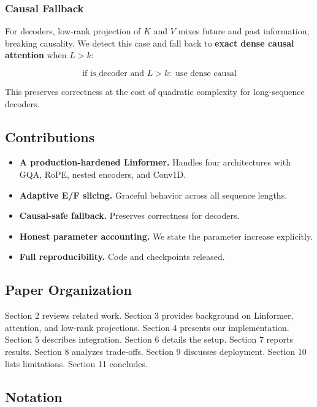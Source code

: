 \subsubsection{Causal Fallback}

For decoders, low-rank projection of $K$ and $V$ mixes future and past 
information, breaking causality. We detect this case and fall back to 
\textbf{exact dense causal attention} when $L > k$:

\[
\text{if } \text{is\_decoder} \text{ and } L > k: \text{ use dense causal}
\tag{1.6}
\]

This preserves correctness at the cost of quadratic complexity for 
long-sequence decoders.

\subsection{Contributions}

\begin{itemize}
\item \textbf{A production-hardened Linformer.} Handles four architectures with
  GQA, RoPE, nested encoders, and Conv1D.
\item \textbf{Adaptive E/F slicing.} Graceful behavior across all sequence lengths.
\item \textbf{Causal-safe fallback.} Preserves correctness for decoders.
\item \textbf{Honest parameter accounting.} We state the parameter increase
  explicitly.
\item \textbf{Full reproducibility.} Code and checkpoints released.

\end{itemize}
\subsection{Paper Organization}

Section 2 reviews related work. Section 3 provides background on Linformer, 
attention, and low-rank projections. Section 4 presents our implementation. 
Section 5 describes integration. Section 6 details the setup. Section 7 
reports results. Section 8 analyzes trade-offs. Section 9 discusses 
deployment. Section 10 lists limitations. Section 11 concludes.



\subsection{Notation}

